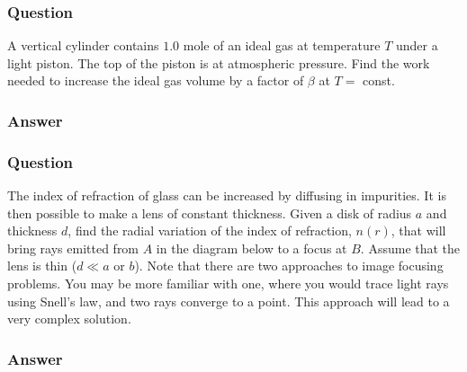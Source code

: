 \subsubsection{Question}
A vertical cylinder contains $1.0$ mole of an ideal gas at temperature $T$ under a light piston. The top of the piston is at atmospheric pressure. Find the work needed to increase the ideal gas volume by a factor of $\beta$ at $T =$ const.
\subsubsection{Answer}


\subsubsection{Question}
The index of refraction of glass can be increased by diffusing in impurities. It is then possible to make a lens of constant thickness. Given a disk of radius $a$ and thickness $d$, find the radial variation of the index of refraction, $n(r)$, that will bring rays emitted from $A$ in the diagram below to a focus at $B$. Assume that the lens is thin ($d \ll a$ or $b$). Note that there are two approaches to image focusing problems. You may be more familiar with one, where you would trace light rays using Snell’s law, and two rays converge to a point. This approach will lead to a very complex solution.
\subsubsection{Answer}



